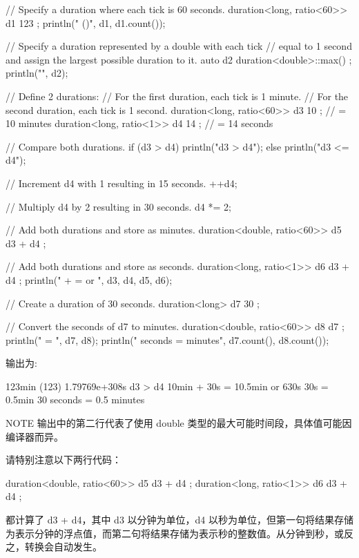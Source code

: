 \begin{cpp}
// Specify a duration where each tick is 60 seconds.
duration<long, ratio<60>> d1 { 123 };
println("{} ({})", d1, d1.count());

// Specify a duration represented by a double with each tick
// equal to 1 second and assign the largest possible duration to it.
auto d2 { duration<double>::max() };
println("{}", d2);

// Define 2 durations:
// For the first duration, each tick is 1 minute.
// For the second duration, each tick is 1 second.
duration<long, ratio<60>> d3 { 10 }; // = 10 minutes
duration<long, ratio<1>> d4 { 14 }; // = 14 seconds

// Compare both durations.
if (d3 > d4) { println("d3 > d4"); }
else { println("d3 <= d4"); }

// Increment d4 with 1 resulting in 15 seconds.
++d4;

// Multiply d4 by 2 resulting in 30 seconds.
d4 *= 2;

// Add both durations and store as minutes.
duration<double, ratio<60>> d5 { d3 + d4 };

// Add both durations and store as seconds.
duration<long, ratio<1>> d6 { d3 + d4 };
println("{} + {} = {} or {}", d3, d4, d5, d6);

// Create a duration of 30 seconds.
duration<long> d7 { 30 };

// Convert the seconds of d7 to minutes.
duration<double, ratio<60>> d8 { d7 };
println("{} = {}", d7, d8);
println("{} seconds = {} minutes", d7.count(), d8.count());
\end{cpp}

输出为:

\begin{shell}
123min (123)
1.79769e+308s
d3 > d4
10min + 30s = 10.5min or 630s
30s = 0.5min
30 seconds = 0.5 minutes
\end{shell}

\begin{myNotic}{NOTE}
输出中的第二行代表了使用 double 类型的最大可能时间段，具体值可能因编译器而异。
\end{myNotic}

请特别注意以下两行代码：

\begin{cpp}
duration<double, ratio<60>> d5 { d3 + d4 };
duration<long, ratio<1>> d6 { d3 + d4 };
\end{cpp}

都计算了 d3 + d4，其中 d3 以分钟为单位，d4 以秒为单位，但第一句将结果存储为表示分钟的浮点值，而第二句将结果存储为表示秒的整数值。从分钟到秒，或反之，转换会自动发生。

